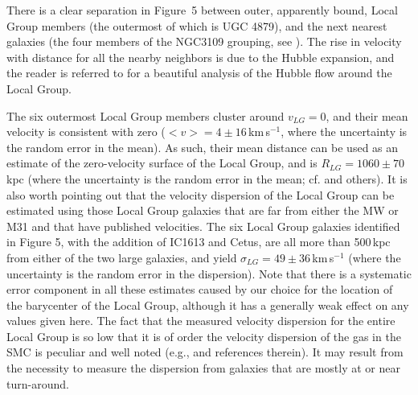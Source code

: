 \documentclass[manuscript]{aastex}
\begin{document}
There is a clear separation in Figure~5 between outer, apparently
bound, Local Group members (the outermost of which is UGC 4879), and
the next nearest galaxies (the four members of the NGC3109 grouping,
see \citealt{vandenbergh1999b}). The rise in velocity with distance
for all the nearby neighbors is due to the Hubble expansion, and the
reader is referred to \cite{karachentsev2009} for a beautiful analysis
of the Hubble flow around the Local Group.  

The six outermost Local Group members cluster around $v_{LG} = 0$, and
their mean velocity is consistent with zero ($<v> = 4 \pm
16$\,km\,s$^{-1}$, where the uncertainty is the random error in the
mean). As such, their mean distance can be used as an estimate of the
zero-velocity surface of the Local Group, and is $R_{LG} = 1060 \pm
70$\,kpc (where the uncertainty is the random error in the mean;
cf. \cite{courteau1999,karachentsev2002a,karachentsev2009} and
others). It is also worth pointing out that the velocity dispersion of
the Local Group can be estimated using those Local Group galaxies that
are far from either the MW or M31 and that have published
velocities. The six Local Group galaxies identified in Figure 5, with
the addition of IC1613 and Cetus, are all more than 500\,kpc from
either of the two large galaxies, and yield $\sigma_{LG} = 49 \pm
36$\,km\,s$^{-1}$ (where the uncertainty is the random error in the
dispersion). Note that there is a systematic error component in all
these estimates caused by our choice for the location of the
barycenter of the Local Group, although it has a generally weak effect
on any values given here. The fact that the measured velocity
dispersion for the entire Local Group is so low that it is of order
the velocity dispersion of the gas in the SMC is peculiar and well
noted (e.g., \citealt{sandage1986} and references therein). It may
result from the necessity to measure the dispersion from galaxies that
are mostly at or near turn-around.
\end{document}
